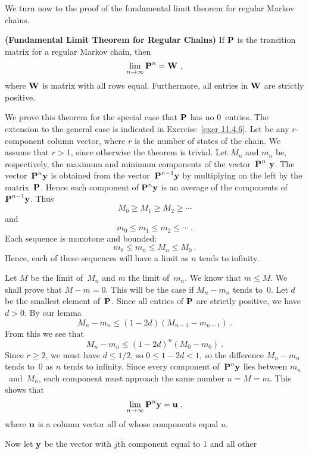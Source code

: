 We turn now to the proof of the fundamental limit theorem for regular Markov
chains.  

\begin{theorem}{\bf (Fundamental Limit Theorem for Regular Chains)}
If ${\mbox{\bf P}\/}$ is the transition matrix for a regular Markov chain, then
$$
\lim_{n \to \infty} \mat {P}^n = \mat {W}\ ,
$$
where ${\mbox{\bf W}\/}$ is matrix with all rows equal.  Furthermore, all entries in
${\mbox{\bf W}\/}$ are 
strictly positive.

\proof
We prove this theorem for the special case that ${\mbox{\bf P}\/}$ has no 0~entries. 
The extension 
to the general case is indicated in Exercise~\ref{exer 11.4.6}. Let  be
any 
$r$-component column vector, where $r$ is the number of states of the chain. 
We assume that
$r > 1$, since otherwise the theorem is trivial.  Let
$M_n$ and
$m_n$ be, respectively, the maximum and minimum components of the
vector~$\mat {P}^n \mat { y}$.  The vector~$\mat {P}^n \mat {y}$ is obtained
from the
vector~${\mbox{\bf P}\/}^{n - 1} 
{\mbox{\bf y}\/}$ by multiplying on the left by the matrix~${\mbox{\bf P}\/}$.  Hence each
component 
of $\mat {P}^n \mat {y}$ is an average of the components of ${\mbox{\bf P}\/}^{n - 1} 
{\mbox{\bf y}\/}$.  Thus
$$
M_0 \geq M_1 \geq M_2 \geq\cdots
$$
and
$$
m_0 \leq m_1 \leq m_2 \leq\cdots\ .
$$
Each sequence is monotone and bounded:
$$
m_0 \leq m_n \leq M_n \leq M_0\ .
$$
Hence, each of these sequences will have a limit as $n$ tends to infinity.
\par
Let $M$ be the limit of~$M_n$ and $m$ the limit of~$m_n$.  We know that $m \leq
M$.  We shall prove that $M - m = 0$.  This will be the case if $M_n - m_n$
tends to~0.  Let $d$ be the smallest element of~${\mbox{\bf P}\/}$.  Since all entries
of ${\mbox{\bf P}\/}$
are strictly positive, we have $d > 0$.  By our lemma
$$
M_n - m_n \leq (1 - 2d)(M_{n - 1} - m_{n - 1})\ .
$$
From this we see that
$$
M_n - m_n \leq (1 - 2d)^n(M_0 - m_0)\ .
$$
Since $r \ge 2$, we must have $d \leq 1/2$, so $0 \leq 1 - 2d < 1$, so 
the difference $M_n - m_n$ tends to~0 as $n$ tends to infinity.  Since every
component of~$\mat {P}^n \mat {y}$ lies between $m_n$~and~$M_n$, each component
must
approach the same number $u = M = m$.  
This shows that
$$
\lim_{n \to \infty} {\mbox{\bf P}\/}^n {\mbox{\bf y}\/} = {\mbox{\bf u}\/}\ ,  \label{eq 11.4.4}
$$
where ${\mbox{\bf u}\/}$ is a column vector all of whose components equal $u$.  
\par
Now let ${\mbox{\bf y}\/}$ be the vector with $j$th component equal to 1 and all other

\end{theorem}
